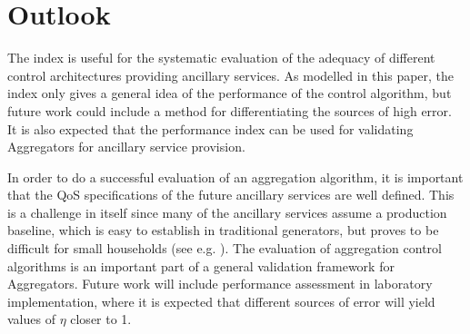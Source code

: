 	\section{Outlook}\label{sec:outlook}
	The index is useful for the systematic evaluation of the adequacy of different control architectures providing ancillary services. As modelled in this paper, the index only gives a general idea of the performance of the control algorithm, but future work could include a method for differentiating the sources of high error. It is also expected that the performance index can be used for validating Aggregators for ancillary service provision. 
	
	In order to do a successful evaluation of an aggregation algorithm, it is important that the QoS specifications of the future ancillary services are well defined. This is a challenge in itself since many of the ancillary services assume a production baseline, which is easy to establish in traditional generators, but proves to be difficult for small households (see e.g. \cite{Borenstein}).
 The evaluation of aggregation control algorithms is an important part of a general validation framework for Aggregators. Future work will include performance assessment in laboratory implementation, where it is expected that different sources of error will yield values of $\eta$ closer to 1.
